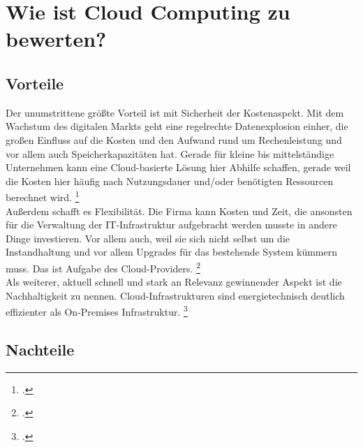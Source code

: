 \chapter{Wie ist Cloud Computing zu bewerten?} %
\label{cha:Wie ist Cloud Computing zu bewerten?}

\section{Vorteile} %
\label{sec:Vorteile}

Der unumstrittene größte Vorteil ist mit Sicherheit der Kostenaspekt. Mit dem Wachstum des digitalen Markts geht eine regelrechte Datenexplosion einher, die großen Einfluss auf die Kosten und den Aufwand rund um Rechenleistung und vor allem auch Speicherkapazitäten hat. Gerade für kleine bis mittelständige Unternehmen kann eine Cloud-basierte Lösung hier Abhilfe schaffen, gerade weil die Kosten hier häufig nach Nutzungsdauer und/oder benötigten Ressourcen berechnet wird. \footcite[Vgl.][]{o.V..27.06.2022} \\
Außerdem schafft es Flexibilität. Die Firma kann Kosten und Zeit, die ansonsten für die Verwaltung der IT-Infrastruktur aufgebracht werden musste in andere Dinge investieren. Vor allem auch, weil sie sich nicht selbst um die Instandhaltung und vor allem Upgrades für das bestehende System kümmern muss. Das ist Aufgabe des Cloud-Providers. \footcite[Vgl.][]{o.V..27.06.2022} \\
Als weiterer, aktuell schnell und stark an Relevanz gewinnender Aspekt ist die Nachhaltigkeit zu nennen. Cloud-Infrastrukturen sind energietechnisch deutlich effizienter als On-Premises Infrastruktur. \footcite[Vgl.][S. 8]{Pohlmann.2022}


\section{Nachteile} %
\label{sec:Nachteile}

